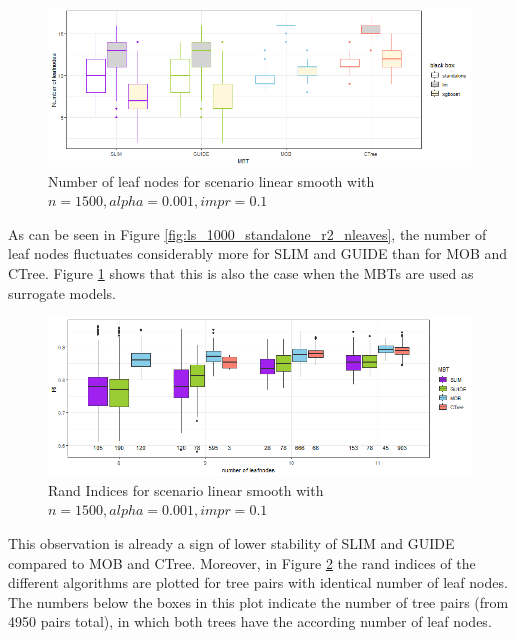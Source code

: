 \begin{figure}[!htb] 
\centering
    \includegraphics[width=14cm]{Figures/simulations/chapter_5_simulation_study/basic_scenarios/linear_smooth/ls_1000_int.png}
    \caption{Number of leaf nodes for scenario linear smooth with $n=1500, alpha = 0.001, impr = 0.1$}
    \label{fig:ls_1000_int}
\end{figure} 


As can be seen in Figure \ref{fig:ls_1000_standalone_r2_nleaves}, the number of leaf nodes fluctuates considerably more for SLIM and GUIDE than for MOB and CTree. 
Figure \ref{fig:ls_1000_int} shows that this is also the case when the MBTs are used as surrogate models. 


\begin{figure}[!htb]
\centering
    \centering
    \includegraphics[width=14cm]{Figures/simulations/chapter_5_simulation_study/basic_scenarios/linear_smooth/ls_1000_standalone_sta.png}
    \caption{Rand Indices for scenario linear smooth with $n=1500, alpha = 0.001, impr = 0.1$}
    \label{fig:ls_1000_standalone_sta}
\end{figure}

This observation is already a sign of lower stability of SLIM and GUIDE compared to MOB and CTree. Moreover, in Figure \ref{fig:ls_1000_standalone_sta} the rand indices of the different algorithms are plotted for tree pairs with identical number of leaf nodes. The numbers below the boxes in this plot indicate the number of tree pairs (from 4950 pairs total), in which both trees have the according number of leaf nodes. 

